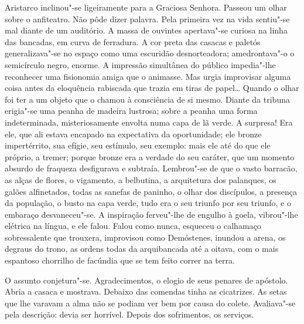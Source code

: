Aristarco inclinou"-se ligeiramente para a Graciosa Senhora.
Passeou um olhar sobre o anfiteatro. Não pôde dizer palavra. Pela
primeira vez na vida sentiu"-se mal diante de um auditório. A massa de
ouvintes apertava"-se curiosa na linha das bancadas, em curva de
ferradura. A cor preta das casacas e paletós generalizava"-se no
espaço como uma escuridão desnorteadora; amedrontava"-o o semicírculo
negro, enorme. A impressão simultânea do público impedia"-lhe
reconhecer uma fisionomia amiga que o animasse. Mas urgia improvisar
alguma coisa antes da eloquência rabiscada que trazia em tiras de
papel\ldots{} Quando o olhar foi ter a um objeto que o chamou à consciência
de si mesmo. Diante da tribuna erigia"-se uma peanha de madeira
lustrosa; sobre a peanha uma forma indeterminada, misteriosamente
envolta numa capa de lã verde. A surpresa! Era ele, que ali estava
encapado na expectativa da oportunidade; ele bronze impertérrito, sua
efígie, seu estímulo, seu exemplo: mais ele até do que ele próprio, a
tremer; porque bronze era a verdade do seu caráter, que um momento
absurdo de fraqueza desfigurava e subtraía. Lembrou"-se de que o vasto
barracão, as alças de flores, o vigamento, a belbutina, a arquitetura
dos palanques, os galões alfinetados, todas as sanefas de paninho, o
olhar dos discípulos, a presença da população, o busto na capa verde,
tudo era o seu triunfo por seu triunfo, e o embaraço desvaneceu"-se. A
inspiração ferveu"-lhe de engulho à goela, vibrou"-lhe elétrica na
língua, e ele falou. Falou como nunca, esqueceu o calhamaço
sobressalente que trouxera, improvisou como Demóstenes, inundou a
arena, os degraus do trono, as ordens todas da arquibancada até a
oitava, com o mais espantoso chorrilho de facúndia que se tem feito
correr na terra. 

O assunto conjetura"-se. Agradecimentos, o elogio de
seus penares de apóstolo. Abria a casaca e mostrava. Debaixo das
comendas tinha as cicatrizes. As setas que lhe varavam a alma não se
podiam ver bem por causa do colete. Avaliava"-se pela descrição: devia
ser horrível. Depois dos sofrimentos, os serviços. 


